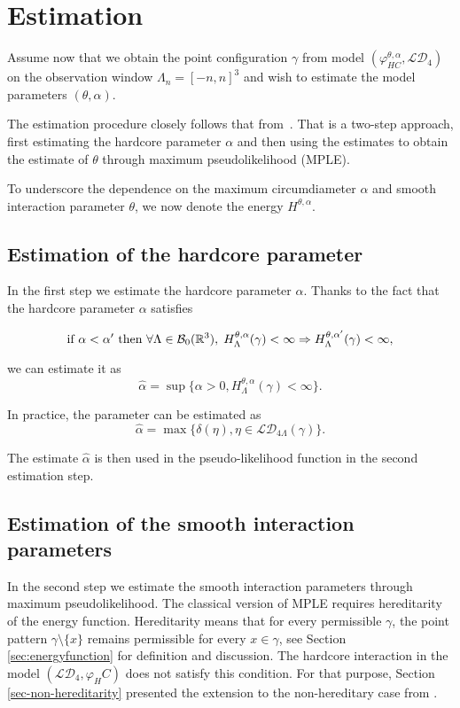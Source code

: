 \chapter{Estimation}
Assume now that we obtain the point configuration $\gamma$ from model $(\varphi^{\theta,\alpha}_{HC},\mathcal {LD}_4)$ on the observation window $\Lambda_n = [-n,n]^3$ and wish to estimate the model parameters $(\theta,\alpha)$.  

The estimation procedure closely follows that from~\cite{DereudreLavancier2010}. That is a two-step approach, first estimating the hardcore parameter $\alpha$ and then using the estimates to obtain the estimate of $\theta$ through maximum pseudolikelihood (MPLE). 

To underscore the dependence on the maximum circumdiameter $\alpha$ and smooth interaction parameter $\theta$, we now denote the energy $H^{\theta,\alpha}$.
\section{Estimation of the hardcore parameter}
In the first step we estimate the hardcore parameter $\alpha$. 
 Thanks to the fact that the hardcore parameter $\alpha$ satisfies

 $$ \text{if } \alpha < \alpha' \text{ then  } \forall \Lambda \in \mathcal B_0({\mathbb R^3}), \; H^{\theta,\alpha}_\Lambda(\gamma) < \infty \Rightarrow  H^{\theta,\alpha'}_\Lambda(\gamma)<\infty,$$ 

we can estimate it as
$$\hat\alpha = \sup\{\alpha > 0, H^{\theta,\alpha}_\Lambda(\gamma) < \infty \}.$$

In practice, the parameter can be estimated as
$$\hat\alpha = \max\{\delta(\eta), \eta\in \mathcal {LD}_{4\Lambda}(\gamma)\}.$$

The estimate $\hat\alpha$ is then used in the pseudo-likelihood function in the second estimation step.


\section{Estimation of the smooth interaction parameters}
In the second step we estimate the smooth interaction parameters through maximum pseudolikelihood.
The classical version of MPLE requires hereditarity of the energy function. Hereditarity means that for every permissible $\gamma$, the point pattern $\gamma\setminus\{x\}$ remains permissible for every $x\in\gamma$, see Section \ref{sec:energyfunction} for definition and discussion. The hardcore interaction in the model $(\mathcal {LD}_4,\varphi_HC)$ does not satisfy this condition. For that purpose, Section \ref{sec-non-hereditarity} presented the extension to the non-hereditary case from \cite{DereudreLavancier2007}. 

